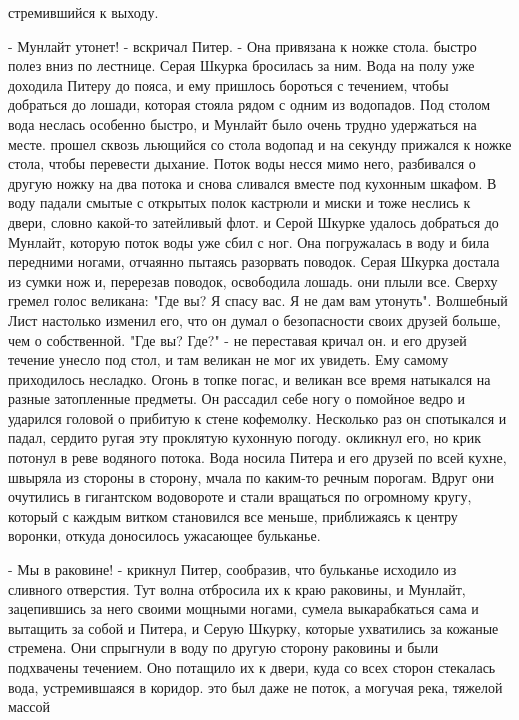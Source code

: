 стремившийся к выходу.
\par- Мунлайт утонет! - вскричал Питер. - Она привязана к ножке стола.
 быстро полез вниз по лестнице. Серая Шкурка бросилась за ним. 
Вода на полу уже доходила Питеру до пояса, и ему пришлось бороться с 
течением, чтобы добраться до лошади, которая стояла рядом с одним из 
водопадов. Под столом вода неслась особенно быстро, и Мунлайт было 
очень трудно удержаться на месте.
 прошел сквозь льющийся со стола водопад и на секунду 
прижался к ножке стола, чтобы перевести дыхание. Поток воды несся мимо 
него, разбивался о другую ножку на два потока и снова сливался вместе 
под кухонным шкафом. В воду падали смытые с открытых полок кастрюли и 
миски и тоже неслись к двери, словно какой-то затейливый флот.
 и Серой Шкурке удалось добраться до Мунлайт, которую поток 
воды уже сбил с ног. Она погружалась в воду и била передними ногами, 
отчаянно пытаясь разорвать поводок. Серая Шкурка достала из сумки нож 
и, перерезав поводок, освободила лошадь.
 они плыли все. Сверху гремел голос великана: "Где вы? Я 
спасу вас. Я не дам вам утонуть". Волшебный Лист настолько изменил 
его, что он думал о безопасности своих друзей больше, чем о 
собственной. "Где вы? Где?" - не переставая кричал он.
 и его друзей течение унесло под стол, и там великан не мог 
их увидеть. Ему самому приходилось несладко. Огонь в топке погас, и 
великан все время натыкался на разные затопленные предметы. Он 
рассадил себе ногу о помойное ведро и ударился головой о прибитую к 
стене кофемолку. Несколько раз он спотыкался и падал, сердито ругая 
эту проклятую кухонную погоду.
 окликнул его, но крик потонул в реве водяного потока. Вода 
носила Питера и его друзей по всей кухне, швыряла из стороны в 
сторону, мчала по каким-то речным порогам. Вдруг они очутились в 
гигантском водовороте и стали вращаться по огромному кругу, который с 
каждым витком становился все меньше, приближаясь к центру воронки, 
откуда доносилось ужасающее бульканье.
\par- Мы в раковине! - крикнул Питер, сообразив, что бульканье 
исходило из сливного отверстия. Тут волна отбросила их к краю 
раковины, и Мунлайт, зацепившись за него своими мощными ногами, сумела 
выкарабкаться сама и вытащить за собой и Питера, и Серую Шкурку, 
которые ухватились за кожаные стремена. Они спрыгнули в воду по другую 
сторону раковины и были подхвачены течением. Оно потащило их к двери, 
куда со всех сторон стекалась вода, устремившаяся в коридор.
 это был даже не поток, а могучая река, тяжелой массой 
